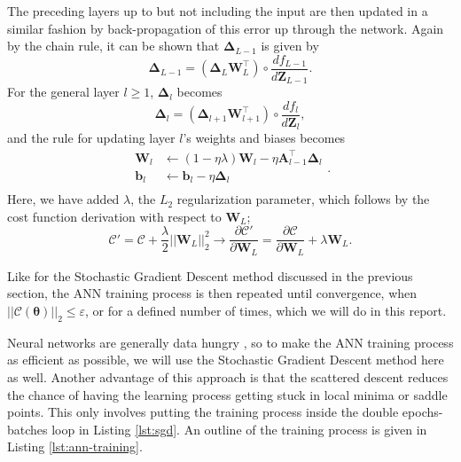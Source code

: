 \documentclass[]{article}
\begin{document}
The preceding layers up to but not including the input are then updated in a similar fashion by back-propagation of this error up through the network. Again by the chain rule, it can be shown that $\mathbf{\Delta}_{L-1}$ is given by
\begin{equation}
	\mathbf{\Delta}_{L-1} = (\mathbf{\Delta}_L \mathbf{W}_L^\intercal) \circ \frac{df_{L-1}}{d\mathbf{Z}_{L-1}}.
\end{equation}
For the general layer $l \ge 1$, $\mathbf{\Delta}_l$ becomes
\begin{equation} \label{update-deltas}
	\mathbf{\Delta}_{l} = (\mathbf{\Delta}_{l+1} \mathbf{W}_{l+1}^\intercal) \circ \frac{df_l}{d\mathbf{Z}_l},
\end{equation}
and the rule for updating layer $l$'s weights and biases becomes
\begin{equation} \label{update-weights-biases}
\begin{aligned}
	\mathbf{W}_l &\leftarrow (1 - \eta \lambda) \mathbf{W}_l - \eta \mathbf{A}_{l-1}^\intercal \mathbf{\Delta}_l \\
	\mathbf{b}_l &\leftarrow \mathbf{b}_l - \eta \mathbf{\Delta}_l \\
\end{aligned}.
\end{equation}
Here, we have added $\lambda$, the $L_2$ regularization parameter, which follows by the cost function derivation with respect to $\mathbf{W}_L$;
\begin{equation}
	\mathcal{C}' = \mathcal{C} + \frac{\lambda}{2} ||\mathbf{W}_L||_2^2 \rightarrow \frac{\partial \mathcal{C}'}{\partial \mathbf{W}_L} = \frac{\partial \mathcal{C}}{\partial \mathbf{W}_L} + \lambda \mathbf{W}_L.
\end{equation}

\vspace{5mm}

Like for the Stochastic Gradient Descent method discussed in the previous section, the ANN training process is then repeated until convergence, when $||\mathcal{C}(\mathbf{\theta})||_2 \le \varepsilon$, or for a defined number of times, which we will do in this report.

\vspace{5mm}

Neural networks are generally data hungry \cite{fys-stk4155-notes}, so to make the ANN training process as efficient as possible, we will use the Stochastic Gradient Descent method here as well. Another advantage of this approach is that the scattered descent reduces the chance of having the learning process getting stuck in local minima or saddle points. This only involves putting the training process inside the double epochs-batches loop in Listing \ref{lst:sgd}. An outline of the training process is given in Listing \ref{lst:ann-training}.
\end{document}
